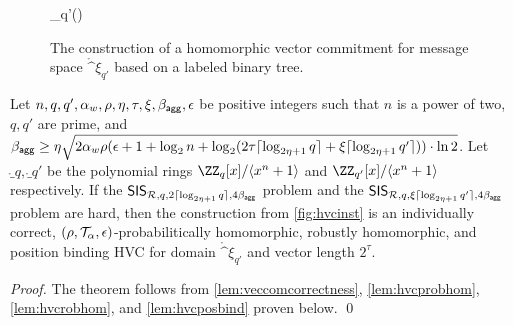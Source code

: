\begin{figure}[t]
\begin{pcvstack}
\begin{pchstack}[center]
{    \pcreturn \proj_{q'}()
  }
\end{pchstack}
  \pcvspace
\begin{pchstack}
    \pchspace
    \pchspace
\end{pchstack}
\end{pcvstack}
\caption{The construction of a homomorphic vector commitment for message space $\ring^\xi_{q'}$ based on a labeled binary tree.}
\label{fig:hvcinst}
\end{figure}

\begin{theorem}\label{theo:veccom}
  Let $n,q,q',\alpha_w,\rho,\eta,\tau,\xi,\beta_{\mathsf{agg}},\epsilon$ be positive integers such that $n$ is a power of two, $q,q'$ are prime, and $\beta_{\mathsf{agg}} \geq \eta\sqrt{2\alpha_w\rho(\epsilon+1+\log_2 n + \log_2(2\tau \lceil\log_{2\eta+1}q\rceil + \xi\lceil\log_{2\eta+1}q'\rceil))\cdot\ln2}$.
  Let $\ring_q,\ring_{q'}$ be the polynomial rings $\ZZ_q[x]/\langle x^n+1\rangle$ and $\ZZ_{q'}[x]/\langle x^n+1\rangle$ respectively.
  If the $\mathsf{SIS}_{\mathcal{R},q,2\lceil \log_{2\eta+1} q \rceil,4\beta_{\mathsf{agg}}}$ problem and the $\mathsf{SIS}_{\mathcal{R},q,\xi\lceil \log_{2\eta+1} q' \rceil,4\beta_{\mathsf{agg}}}$ problem are hard, then the construction from \autoref{fig:hvcinst} is an individually correct, $(\rho,\mathcal{T}_\alpha,\epsilon)$-probabilitically homomorphic, robustly homomorphic, and position binding HVC for domain $\ring^{\xi}_{q'}$ and vector length $2^\tau$.
\end{theorem}
\begin{proof}
  The theorem follows from \autoref{lem:veccomcorrectness}, \autoref{lem:hvcprobhom}, \autoref{lem:hvcrobhom}, and \autoref{lem:hvcposbind} proven below. \qed
\end{proof}

